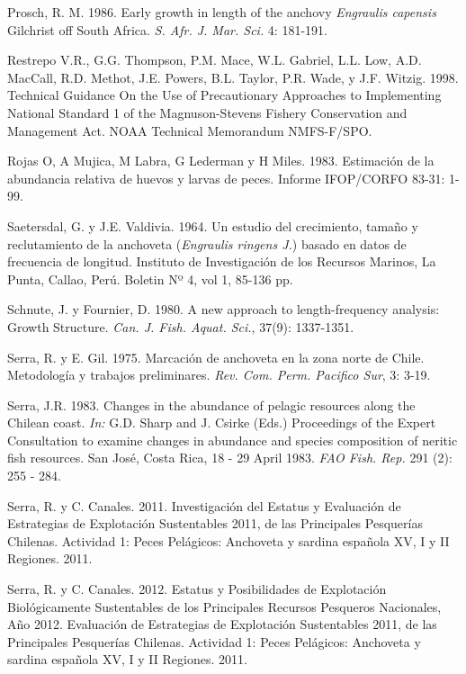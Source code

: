 \documentclass[letter,11pt]{article}
\begin{document}
Prosch, R. M. 1986. Early growth in length of the anchovy
\textit{Engraulis capensis} Gilchrist off South Africa.
\textit{S. Afr. J. Mar. Sci.} 4: 181-191.

Restrepo V.R., G.G. Thompson, P.M. Mace, W.L. Gabriel, L.L. Low, A.D.
MacCall, R.D. Methot, J.E. Powers, B.L. Taylor, P.R. Wade, y J.F.
Witzig. 1998. Technical Guidance On the Use of Precautionary Approaches
to Implementing National Standard 1 of the Magnuson-Stevens Fishery
Conservation and Management Act. NOAA Technical Memorandum NMFS-F/SPO.

Rojas O, A Mujica, M Labra, G Lederman y H Miles. 1983. Estimaci\'on de la
abundancia relativa de huevos y larvas de peces. Informe IFOP/CORFO
83-31: 1-99.

Saetersdal, G. y J.E. Valdivia. 1964. Un estudio del crecimiento, tama\~{n}o
y reclutamiento de la anchoveta (\textit{Engraulis ringens J.}) basado en datos
de frecuencia de longitud. Instituto de Investigaci\'on de los Recursos
Marinos, La Punta, Callao, Per\'u. Boletin Nº 4, vol 1, 85-136 pp.

Schnute, J. y Fournier, D. 1980. A new approach to length-frequency
analysis: Growth Structure. \textit{Can. J. Fish. Aquat. Sci.}, 37(9):
1337-1351.

Serra, R. y E. Gil. 1975. Marcaci\'on de anchoveta en la zona norte de
Chile. Metodolog\'ia y trabajos preliminares.
\textit{Rev. Com. Perm. Pacifico Sur}, 3: 3-19.

Serra, J.R. 1983. Changes in the abundance of pelagic resources along
the Chilean coast. \textit{In:} G.D. Sharp and J. Csirke (Eds.)
Proceedings of the Expert Consultation to examine changes in abundance
and species composition of neritic fish resources. San Jos\'e, Costa Rica,
18 - 29 April 1983. \textit{FAO Fish. Rep.} 291 (2): 255 - 284.

Serra, R. y C. Canales. 2011. Investigaci\'on del Estatus y Evaluaci\'on de
Estrategias de Explotaci\'on Sustentables 2011, de las Principales
Pesquer\'ias Chilenas. Actividad 1: Peces Pel\'agicos: Anchoveta y sardina
espa\~{n}ola XV, I y II Regiones. 2011.

Serra, R. y C. Canales. 2012. Estatus y Posibilidades de Explotaci\'on
Biol\'ogicamente Sustentables de los Principales Recursos Pesqueros
Nacionales, A\~{n}o 2012. Evaluaci\'on de Estrategias de Explotaci\'on
Sustentables 2011, de las Principales Pesquer\'ias Chilenas. Actividad 1:
Peces Pel\'agicos: Anchoveta y sardina espa\~{n}ola XV, I y II Regiones. 2011.
\end{document}
